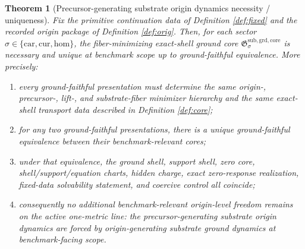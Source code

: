 \documentclass[11pt]{article}
\newcommand{\Car}{\mathrm{car}}
\newcommand{\Cur}{\mathrm{cur}}
\newcommand{\Hom}{\mathrm{hom}}
\newcommand{\GroundCore}{\mathfrak G^{\mathrm{sub,grd,core}}}
\newtheorem{theorem}{Theorem}
\begin{document}
\begin{theorem}[Precursor-generating substrate origin dynamics necessity / uniqueness]
\label{thm:main}
Fix the primitive continuation data of Definition \ref{def:fixed} and the recorded origin package of Definition \ref{def:orig}. Then, for each sector \(\sigma\in\{\Car,\Cur,\Hom\}\), the fiber-minimizing exact-shell ground core \(\GroundCore_{\sigma}\) is necessary and unique at benchmark scope up to ground-faithful equivalence. More precisely:
\begin{enumerate}
    \item every ground-faithful presentation must determine the same origin-, precursor-, lift-, and substrate-fiber minimizer hierarchy and the same exact-shell transport data described in Definition \ref{def:core};
    \item for any two ground-faithful presentations, there is a unique ground-faithful equivalence between their benchmark-relevant cores;
    \item under that equivalence, the ground shell, support shell, zero core, shell/support/equation charts, hidden charge, exact zero-response realization, fixed-data solvability statement, and coercive control all coincide;
    \item consequently no additional benchmark-relevant origin-level freedom remains on the active one-metric line: the precursor-generating substrate origin dynamics are forced by origin-generating substrate ground dynamics at benchmark-facing scope.
\end{enumerate}
\end{theorem}
\end{document}
